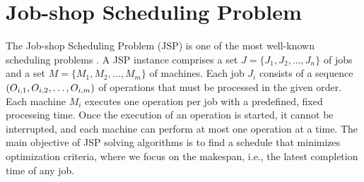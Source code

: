 \documentclass[runningheads]{llncs}
\begin{document}
\section{Job-shop Scheduling Problem}\label{sec:problem}
The Job-shop Scheduling Problem (JSP) is one of the most well-known scheduling problems \cite{baker1974introduction,lenstra1979computational,taillard1993benchmarks}. A JSP instance comprises a set $J = \{ J_1, J_2, \dots ,J_n \}$  of jobs and a set $M = \{ M_1, M_2, \dots ,M_m \}$ of machines. Each job $J_i$ consists of a sequence $(O_{i,1},\linebreak[1] O_{i,2},\linebreak[1] \dots ,O_{i,m})$ of operations that must be processed in the given order. Each machine $M_i$ executes one operation per job with a predefined, fixed processing time.
Once the execution of an operation is started, it cannot be interrupted,
and each machine can perform at most one operation at a time.
The main objective of JSP solving algorithms is to find a schedule that minimizes optimization criteria,
where we focus on the makespan, i.e., the latest completion time of any job.
\end{document}
